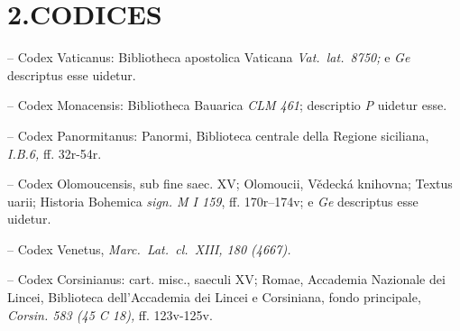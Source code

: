 \documentclass[a5paper,twoside]{article}
\begin{document}
\section*{2.\thinspace CODICES}

\bigskip

\begin{description}[noitemsep,itemsep=3pt,labelsep=5pt,font=\rmfamily]
\item[va] -- Codex Vaticanus: Bibliotheca apostolica Vaticana \emph{Vat.~lat.\ 8750;} e \textit{Ge} descriptus esse uidetur.
\item[m\hphantom{i}] -- Codex Monacensis: Bibliotheca Bauarica \emph{CLM 461}; descriptio \textit{P} uidetur esse.
\item[pa] -- Codex Panormitanus: Panormi, Biblioteca centrale della Regione siciliana, \emph{I.B.6,} ff. 32r-54r.
\item[o\hphantom{o}] -- Codex Olomoucensis, sub fine saec. XV; Olomoucii, Vědecká knihovna; Textus uarii; Historia Bohemica \emph{sign. M I 159}, ff. 170r–174v; e \textit{Ge} descriptus esse uidetur.
\item[ve] -- Codex Venetus, \emph{Marc.~Lat.\ cl.~XIII, 180 (4667).}
\item[co] -- Codex Corsinianus: cart. misc., saeculi XV; Romae, Accademia Nazionale dei Lincei, Biblioteca dell'Accademia dei Lincei e Corsiniana, fondo principale, \emph{Corsin. 583 (45 C 18),} ff. 123v-125v.
\end{description}


\clearpage
\thispagestyle{empty}
\hfill
\clearpage
\end{document}
